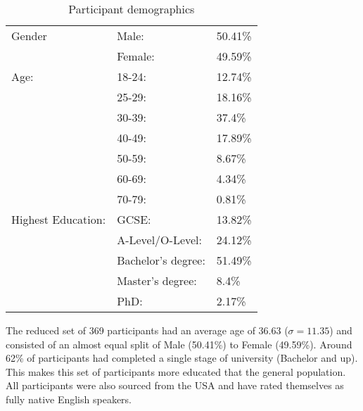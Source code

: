 \begin{table}[h]
    \centering
    \begin{tabular}{|l|ll|}
        \hline
        Gender & Male: & 50.41\% \\
               & Female: & 49.59\% \\
        \hline
        Age:   & 18-24: & 12.74\% \\ 
               & 25-29: & 18.16\% \\ 
               & 30-39: & 37.4\% \\ 
               & 40-49: & 17.89\% \\ 
               & 50-59: & 8.67\% \\ 
               & 60-69: & 4.34\% \\ 
               & 70-79: & 0.81\% \\ 

        \hline
        Highest Education:  
        & GCSE:                 & 13.82\%  \\
        & A-Level/O-Level:      & 24.12\% \\
        & Bachelor's degree:    & 51.49\% \\
        & Master's degree:      & 8.4\% \\ 
        & PhD:                  & 2.17\% \\
        \hline

    \end{tabular}
    \caption{Participant demographics}
    \label{tab:exp2_demo}
\end{table}

The reduced set of 369 participants had an average age of 36.63 ($\sigma = 11.35$) and consisted of an almost equal split of Male (50.41\%) to Female (49.59\%). Around 62\% of participants had completed a single stage of university (Bachelor and up). This makes this set of participants more educated that the general population. All participants were also sourced from the USA and have rated themselves as fully native English speakers.
        
